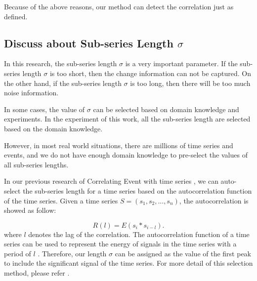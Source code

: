 Because of the above reasons, our method can detect the correlation just as defined.

\subsection{Discuss about Sub-series Length $\sigma$}

In this research, the sub-series length $\sigma$ is a very important parameter.
If the sub-series length $\sigma$ is too short, then the change information can not be captured. 
On the other hand, if the sub-series length $\sigma$ is too long, then there will be too much noise information.

In some cases, the value of $\sigma$ can be selected based on domain knowledge and experiments. In the experiment of this work, all the sub-series length are selected based on the domain knowledge. 

However, in most real world situations, there are millions of time series and events, and we do not have enough domain knowledge to pre-select the values of all sub-series lengths. 

In our previous research of Correlating Event with time series \cite{luo2014correlating}, we can auto-select the sub-series length for a time series based on the autocorrelation function \cite{hamilton1994time} of the time series.
Given a time series $S=(s_1,s_2,...,s_n)$, the autocorrelation is showed as follow:

\begin{equation}
R(l) = E(s_i*s_{i-l}).
\end{equation}
where $l$ denotes the lag of the correlation. The autocorrelation function of a time series can be used to represent the energy of signals in the time series with a period of $l$ \cite{hamilton1994time}. Therefore, our length $\sigma$ can be assigned as the value of the first peak to include the significant signal of the time series. For more detail of this selection method, please refer \cite{luo2014correlating}.
